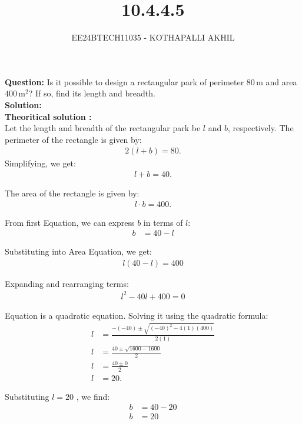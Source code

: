 \documentclass[article]{IEEEtran}
\numberwithin{figure}{enumi}
\begin{document}

\title{10.4.4.5}
\author{EE24BTECH11035 - KOTHAPALLI AKHIL}
{\let\newpage\relax\maketitle}

\noindent\textbf{Question:}  
Is it possible to design a rectangular park of perimeter $80 \, \text{m}$ and area $400 \, \text{m}^2$? If so, find its length and breadth. \\

\noindent\textbf{Solution:} \\
\textbf{Theoritical solution :}\\
Let the length and breadth of the rectangular park be $l$ and $b$, respectively. The perimeter of the rectangle is given by:
\begin{align}
    2(l + b) = 80.
\end{align}
Simplifying, we get:
\begin{align}
    l + b = 40. 
\end{align}

The area of the rectangle is given by:
\begin{align}
    l \cdot b = 400. 
\end{align}

From first Equation, we can express $b$ in terms of $l$:
\begin{align}
    b &= 40 - l 
\end{align}

Substituting into Area Equation, we get:
\begin{align}
    l(40 - l) = 400
\end{align}

Expanding and rearranging terms:
\begin{align}
    l^2 - 40l + 400 = 0
\end{align}

Equation  is a quadratic equation. Solving it using the quadratic formula:
\begin{align}
    l &= \frac{-(-40) \pm \sqrt{(-40)^2 - 4(1)(400)}}{2(1)} \\
    l &= \frac{40 \pm \sqrt{1600 - 1600}}{2} \\
    l &= \frac{40 \pm 0}{2} \\
    l &= 20.
\end{align}

Substituting $l = 20$ , we find:
\begin{align}
    b &= 40 - 20 \\
    b &= 20
\end{align}
\end{document}
